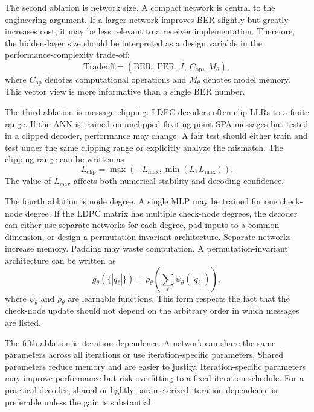 The second ablation is network size. A compact network is central to the engineering argument. If a larger network improves BER slightly but greatly increases cost, it may be less relevant to a receiver implementation. Therefore, the hidden-layer size should be interpreted as a design variable in the performance-complexity trade-off:
\begin{equation}
  \mathrm{Tradeoff}=
  \left(\mathrm{BER},\ \mathrm{FER},\ \bar{I},\ C_{\mathrm{op}},\ M_{\theta}\right),
\end{equation}
where $C_{\mathrm{op}}$ denotes computational operations and $M_{\theta}$ denotes model memory. This vector view is more informative than a single BER number.

The third ablation is message clipping. LDPC decoders often clip LLRs to a finite range. If the ANN is trained on unclipped floating-point SPA messages but tested in a clipped decoder, performance may change. A fair test should either train and test under the same clipping range or explicitly analyze the mismatch. The clipping range can be written as
\begin{equation}
  L_{\mathrm{clip}}=\max(-L_{\max},\min(L,L_{\max})).
\end{equation}
The value of $L_{\max}$ affects both numerical stability and decoding confidence.

The fourth ablation is node degree. A single MLP may be trained for one check-node degree. If the LDPC matrix has multiple check-node degrees, the decoder can either use separate networks for each degree, pad inputs to a common dimension, or design a permutation-invariant architecture. Separate networks increase memory. Padding may waste computation. A permutation-invariant architecture can be written as
\begin{equation}
  g_\theta(\{|q_\ell|\})=
  \rho_\theta\left(\sum_{\ell}\psi_\theta(|q_\ell|)\right),
\end{equation}
where $\psi_\theta$ and $\rho_\theta$ are learnable functions. This form respects the fact that the check-node update should not depend on the arbitrary order in which messages are listed.

The fifth ablation is iteration dependence. A network can share the same parameters across all iterations or use iteration-specific parameters. Shared parameters reduce memory and are easier to justify. Iteration-specific parameters may improve performance but risk overfitting to a fixed iteration schedule. For a practical decoder, shared or lightly parameterized iteration dependence is preferable unless the gain is substantial.

